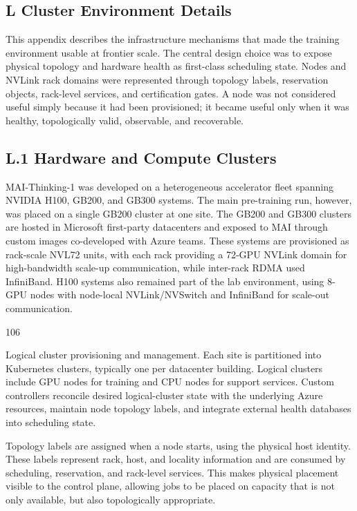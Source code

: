 \documentclass[
  10
]{article}
\begin{document}
\subsection{L Cluster Environment
Details}\label{l-cluster-environment-details}

This appendix describes the infrastructure mechanisms that made the
training environment usable at frontier scale. The central design choice
was to expose physical topology and hardware health as first-class
scheduling state. Nodes and NVLink rack domains were represented through
topology labels, reservation objects, rack-level services, and
certification gates. A node was not considered useful simply because it
had been provisioned; it became useful only when it was healthy,
topologically valid, observable, and recoverable.

\subsection{L.1 Hardware and Compute
Clusters}\label{l.1-hardware-and-compute-clusters}

MAI-Thinking-1 was developed on a heterogeneous accelerator fleet
spanning NVIDIA H100, GB200, and GB300 systems. The main pre-training
run, however, was placed on a single GB200 cluster at one site. The
GB200 and GB300 clusters are hosted in Microsoft first-party datacenters
and exposed to MAI through custom images co-developed with Azure teams.
These systems are provisioned as rack-scale NVL72 units, with each rack
providing a 72-GPU NVLink domain for high-bandwidth scale-up
communication, while inter-rack RDMA used InfiniBand. H100 systems also
remained part of the lab environment, using 8-GPU nodes with node-local
NVLink/NVSwitch and InfiniBand for scale-out communication.

106

Logical cluster provisioning and management. Each site is partitioned
into Kubernetes clusters, typically one per datacenter building. Logical
clusters include GPU nodes for training and CPU nodes for support
services. Custom controllers reconcile desired logical-cluster state
with the underlying Azure resources, maintain node topology labels, and
integrate external health databases into scheduling state.

Topology labels are assigned when a node starts, using the physical host
identity. These labels represent rack, host, and locality information
and are consumed by scheduling, reservation, and rack-level services.
This makes physical placement visible to the control plane, allowing
jobs to be placed on capacity that is not only available, but also
topologically appropriate.
\end{document}
